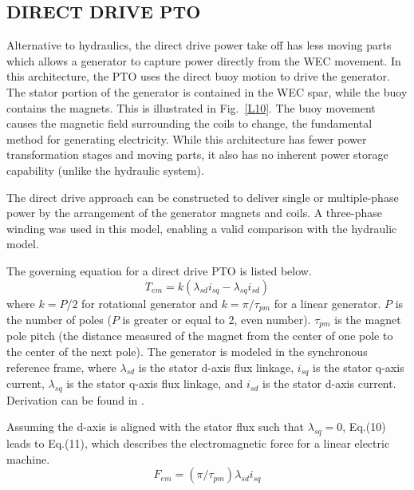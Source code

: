 \documentclass[twocolumn,10pt]{asme2e}
\begin{document}
\subsection*{DIRECT DRIVE PTO}
Alternative to hydraulics, the direct drive power take off has less moving parts which allows a generator to capture power directly from the WEC movement. In this architecture, the PTO uses the direct buoy motion to drive the generator. The stator portion of the generator is contained in the WEC spar, while the buoy contains the magnets. This is illustrated in Fig.~\ref{L10}. The buoy movement causes the magnetic field surrounding the coils to change, the fundamental method for generating electricity. While this architecture has fewer power transformation stages and moving parts, it also has no inherent power storage capability (unlike the hydraulic system).

The direct drive approach can be constructed to deliver single or multiple-phase power by the arrangement of the generator magnets and coils. A three-phase winding was used in this model, enabling a valid comparison with the hydraulic model.  

The governing equation for a direct drive PTO is listed below. 
\begin{equation}
T_{em}=k(\lambda_{sd}i_{sq}- \lambda_{sq}i_{sd})
\end{equation}
\noindent where $k = P/2$ for rotational generator and $k = \pi/\tau_{pm}$ for a linear generator. $P$ is the number of poles ($P$ is greater or equal to 2, even number). $\tau_{pm}$ is the magnet pole pitch (the distance measured of the magnet from the center of one pole to the center of the next pole). The generator is modeled in the synchronous reference frame, where $\lambda_{sd}$ is the stator d-axis flux linkage, $i_{sq}$ is the stator q-axis current, $\lambda_{sq}$ is the stator q-axis flux linkage, and $i_{sd}$ is the stator d-axis current.  Derivation can be found in \cite{mohan2001advanced}.

Assuming the d-axis is aligned with the stator flux such that $\lambda_{sq} = 0$, Eq.(10) leads to Eq.(11), which describes the electromagnetic force for a linear electric machine. 
\begin{equation}
F_{em}=(\pi/\tau_{pm})\lambda_{sd}i_{sq}
\end{equation}
\end{document}
